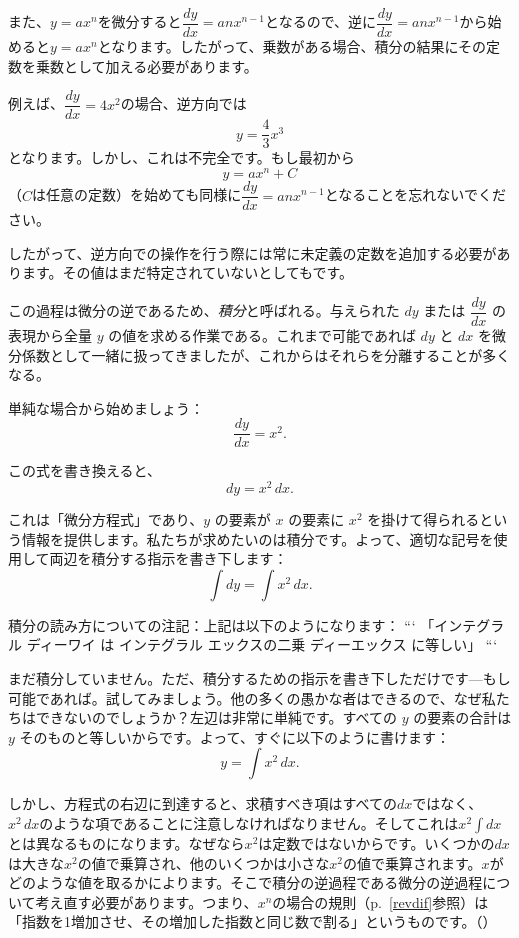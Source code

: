 \documentclass[a4paper,11pt,openany]{ltjsbook}
\newcommand{\Pageref}[2][p.]{#1~\ref{#2}}
\begin{document}
また、$y = ax^n$を微分すると$\dfrac{dy}{dx} = anx^{n-1}$となるので、逆に$\dfrac{dy}{dx} = anx^{n-1}$から始めると$y = ax^n$となります。したがって、乗数がある場合、積分の結果にその定数を乗数として加える必要があります。

例えば、$\dfrac{dy}{dx} = 4x^2$の場合、逆方向では
\[
y = \dfrac{4}{3} x^3
\]
となります。しかし、これは不完全です。もし最初から
\[
y = ax^n + C
\]
（$C$は任意の定数）を始めても同様に$\dfrac{dy}{dx} = anx^{n-1}$となることを忘れないでください。

したがって、逆方向での操作を行う際には常に未定義の定数を追加する必要があります。その値はまだ特定されていないとしてもです。

この過程は微分の逆であるため、\emph{積分}と呼ばれる。与えられた \( dy \) または \( \dfrac{dy}{dx} \) の表現から全量 \( y \) の値を求める作業である。これまで可能であれば \( dy \) と \( dx \) を微分係数として一緒に扱ってきましたが、これからはそれらを分離することが多くなる。

単純な場合から始めましょう：
\[
\dfrac{dy}{dx} = x^2.
\]

この式を書き換えると、
\[
dy = x^2 \, dx.
\]

これは「微分方程式」であり、\( y \) の要素が \( x \) の要素に \( x^2 \) を掛けて得られるという情報を提供します。私たちが求めたいのは積分です。よって、適切な記号を使用して両辺を積分する指示を書き下します：
\[
\int dy = \int x^2 \, dx.
\]

積分の読み方についての注記：上記は以下のようになります：
```
「インテグラル ディーワイ は インテグラル エックスの二乗 ディーエックス に等しい」
```

まだ積分していません。ただ、積分するための指示を書き下しただけです---もし可能であれば。試してみましょう。他の多くの愚かな者はできるので、なぜ私たちはできないのでしょうか？左辺は非常に単純です。すべての \( y \) の要素の合計は \( y \) そのものと等しいからです。よって、すぐに以下のように書けます：
\[
y = \int x^2 \, dx.
\]

しかし、方程式の右辺に到達すると、求積すべき項はすべての$dx$ではなく、$x^2\, dx$のような項であることに注意しなければなりません。そしてこれは$x^2 \displaystyle \int dx$とは異なるものになります。なぜなら$x^2$は定数ではないからです。いくつかの$dx$は大きな$x^2$の値で乗算され、他のいくつかは小さな$x^2$の値で乗算されます。$x$がどのような値を取るかによります。そこで積分の逆過程である微分の逆過程について考え直す必要があります。つまり、$x^n$の場合の規則（\Pageref{revdif}参照）は「指数を1増加させ、その増加した指数と同じ数で割る」というものです。（）
\end{document}
